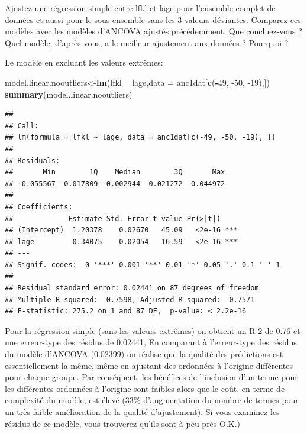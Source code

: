 \documentclass[12pt,]{book}
\makeatletter
\newenvironment{Shaded}{\begin{snugshade}}{\end{snugshade}}
\newcommand{\DataTypeTok}[1]{\textcolor[rgb]{0.13,0.29,0.53}{#1}}
\newcommand{\DecValTok}[1]{\textcolor[rgb]{0.00,0.00,0.81}{#1}}
\newcommand{\KeywordTok}[1]{\textcolor[rgb]{0.13,0.29,0.53}{\textbf{#1}}}
\newcommand{\NormalTok}[1]{#1}
\newcommand{\OperatorTok}[1]{\textcolor[rgb]{0.81,0.36,0.00}{\textbf{#1}}}
\newcommand{\StringTok}[1]{\textcolor[rgb]{0.31,0.60,0.02}{#1}}
\newenvironment{kframe}{%
\medskip{}
\setlength{\fboxsep}{.8em}
\def\at@end@of@kframe{}%
\ifinner\ifhmode%
 \def\at@end@of@kframe{\end{minipage}}%
 \begin{minipage}{\columnwidth}%
\fi\fi%
\def\FrameCommand##1{\hskip\@totalleftmargin \hskip-\fboxsep
\colorbox{incolor}{##1}\hskip-\fboxsep
    \hskip-\linewidth \hskip-\@totalleftmargin \hskip\columnwidth}%
\MakeFramed {\advance\hsize-\width
  \@totalleftmargin\z@ \linewidth\hsize
  \@setminipage}}%
{\par\unskip\endMakeFramed%
\at@end@of@kframe}
\newenvironment{rmdblock}[1]
 {
 \begin{itemize}
 \renewcommand{\labelitemi}{
   \raisebox{-.7\height}[0pt][0pt]{
     {\setkeys{Gin}{width=3em,keepaspectratio}\texttt{[image: images/\#1]}}
   }
 }
 \begin{kframe}
 \setlength{\fboxsep}{1em}
 \item
 }
 {
 \end{kframe}
 \end{itemize}
 }
\newenvironment{rmdcode}
  {\begin{rmdblock}{screen}}
  {\end{rmdblock}}
\makeatother
\begin{document}
\begin{rmdcode}
Ajustez une régression simple entre lfkl et lage pour l'ensemble complet de données et aussi pour le sous-ensemble sans les 3 valeurs déviantes. Comparez ces modèles avec les modèles d'ANCOVA ajustés précédemment. Que concluez-vous ? Quel modèle, d'après vous, a le meilleur ajustement aux données ? Pourquoi ?
\end{rmdcode}

Le modèle en excluant les valeurs extrêmes:

\begin{Shaded}
\begin{Highlighting}[]
\NormalTok{model.linear.nooutliers<-}\KeywordTok{lm}\NormalTok{(lfkl }\OperatorTok{~}\StringTok{ }\NormalTok{lage,}\DataTypeTok{data =}\NormalTok{ anc1dat[}\KeywordTok{c}\NormalTok{(}\OperatorTok{-}\DecValTok{49}\NormalTok{, }\DecValTok{-50}\NormalTok{, }\DecValTok{-19}\NormalTok{),])}
\KeywordTok{summary}\NormalTok{(model.linear.nooutliers)}
\end{Highlighting}
\end{Shaded}

\begin{verbatim}
## 
## Call:
## lm(formula = lfkl ~ lage, data = anc1dat[c(-49, -50, -19), ])
## 
## Residuals:
##       Min        1Q    Median        3Q       Max 
## -0.055567 -0.017809 -0.002944  0.021272  0.044972 
## 
## Coefficients:
##             Estimate Std. Error t value Pr(>|t|)    
## (Intercept)  1.20378    0.02670   45.09   <2e-16 ***
## lage         0.34075    0.02054   16.59   <2e-16 ***
## ---
## Signif. codes:  0 '***' 0.001 '**' 0.01 '*' 0.05 '.' 0.1 ' ' 1
## 
## Residual standard error: 0.02441 on 87 degrees of freedom
## Multiple R-squared:  0.7598, Adjusted R-squared:  0.7571 
## F-statistic: 275.2 on 1 and 87 DF,  p-value: < 2.2e-16
\end{verbatim}

Pour la régression simple (sans les valeurs extrêmes) on obtient un R 2 de 0.76 et une erreur-type des résidus de 0.02441, En comparant à l'erreur-type des résidus du modèle d'ANCOVA (0.02399) on réalise que la qualité des prédictions est essentiellement la même, même en ajustant des ordonnées à l'origine différentes pour chaque groupe. Par conséquent, les bénéfices de l'inclusion d'un terme pour les différentes ordonnées à l'origine sont faibles alors que le coût, en terme de complexité du modèle, est élevé (33\% d'augmentation du nombre de termes pour un très faible amélioration de la qualité d'ajustement). Si vous examinez les résidus de ce modèle, vous trouverez qu'ils sont à peu près O.K.)
\end{document}
